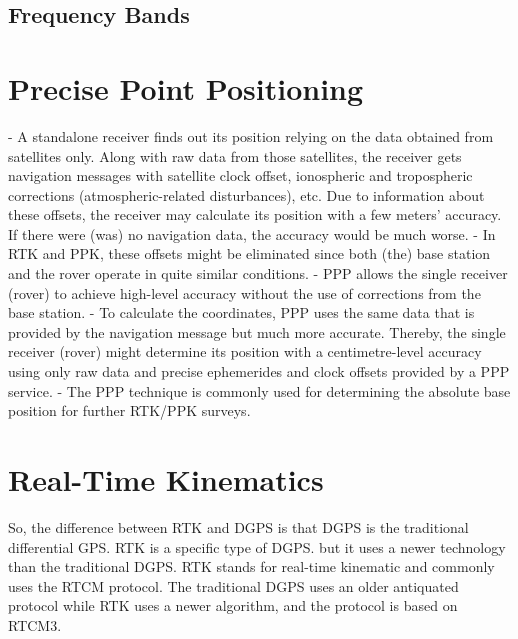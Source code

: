 \subsection{Frequency Bands}\label{sec:II_gnss_freq_bands}

\section{Precise Point Positioning}\label{sec:II_ppp}

- A standalone receiver finds out its position relying on the data obtained from satellites only. Along with raw data from those satellites, the receiver gets navigation messages with satellite clock offset, ionospheric and tropospheric corrections (atmospheric-related disturbances), etc. Due to information about these offsets, the receiver may calculate its position with a few meters' accuracy. If there were (was) no navigation data, the accuracy would be much worse.
- In RTK and PPK, these offsets might be eliminated since both (the) base station and the rover operate in quite similar conditions.
- PPP allows the single receiver (rover) to achieve high-level accuracy without the use of corrections from the base station.
- To calculate the coordinates, PPP uses the same data that is provided by the navigation message but much more accurate. Thereby, the single receiver (rover) might determine its position with a centimetre-level accuracy using only raw data and precise ephemerides and clock offsets provided by a PPP service.
- The PPP technique is commonly used for determining the absolute base position for further RTK/PPK surveys.

\section{Real-Time Kinematics}\label{sec:II_rtk}

So, the difference between RTK and DGPS is that DGPS is the traditional differential GPS.
RTK is a specific type of DGPS.
but it uses a newer technology than the traditional DGPS.
RTK stands for real-time kinematic and commonly uses the RTCM protocol.
The traditional DGPS uses an older antiquated protocol while RTK uses a newer algorithm, and the protocol is based on RTCM3. 

